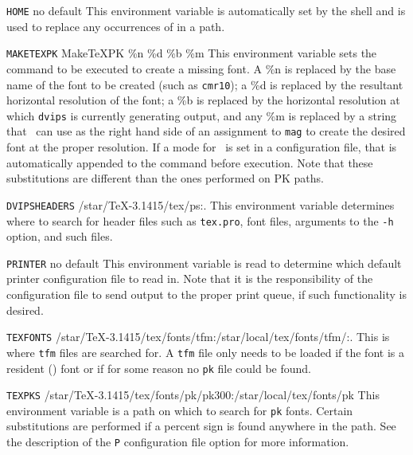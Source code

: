 \begin{list}%
{}%
{\settowidth{\labelwidth}{\tt DVIPSHEADERS}
\settowidth{\labelsep}{aaaa}
\settowidth{\rightmargin}{aaa}
\addtolength{\labelwidth}{\labelsep}
\setlength{\leftmargin}{\labelwidth}}
%

\item [\tt HOME]{\rm no default}
  This environment variable is automatically set by the shell and is
used to replace any occurrences of {\tt \tilde} in a path.

\item [\tt MAKETEXPK]{MakeTeXPK \%n \%d \%b \%m}
This environment variable sets the command to be executed to create
a missing font.  A \%n is replaced by the base name of the font to
be created (such as {\tt cmr10}); a \%d is replaced by the resultant
horizontal resolution of the font; a \%b is replaced by the
horizontal resolution at which {\tt dvips} is currently generating
output, and any \%m is replaced by a string that \MF\ can use as
the right hand side of an assignment to {\tt mag} to create the
desired font at the proper resolution.  If a mode for \MF\ is set in
a configuration file, that is automatically appended to the command
before execution.  Note that these substitutions are different than
the ones performed on PK paths.

\item [\tt DVIPSHEADERS]{/star/TeX-3.1415/tex/ps:.}
  This environment variable determines where to search for header
files such as {\tt tex.pro}, font files, arguments to the
{\tt -h} option, and such files.

\item [\tt PRINTER]{\rm no default}
  This environment variable is read to determine which default printer
configuration file to read in.  Note that it is the responsibility of
the configuration file to send output to the proper print queue, if such
functionality is desired.

\item [\tt TEXFONTS]{/star/TeX-3.1415/tex/fonts/tfm:/star/local/tex/fonts/tfm/:.}
  This is where {\tt tfm} files are searched for.  A {\tt tfm} file only
needs to be loaded if the font is a resident (\PS ) font or if
for some reason no {\tt pk} file could be found.

\item [\tt TEXPKS]{/star/TeX-3.1415/tex/fonts/pk/pk300:/star/local/tex/fonts/pk}
This environment variable is a path on which to search for {\tt pk} fonts.
Certain substitutions are performed if a percent sign is found anywhere
in the path.  See the description of the {\tt P} configuration file
option for more information.


\end{list}
